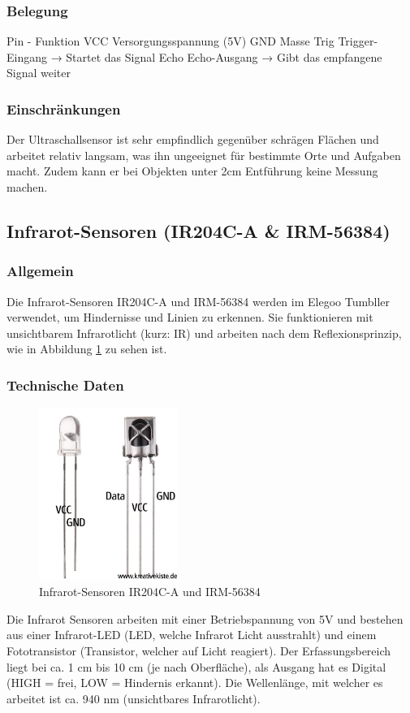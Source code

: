 \subsubsection{Belegung}
Pin  -   	Funktion
VCC	Versorgungsspannung (5V)
GND	Masse
Trig	Trigger-Eingang → Startet das Signal
Echo	Echo-Ausgang → Gibt das empfangene Signal weiter
\subsubsection{Einschränkungen}
Der Ultraschallsensor ist sehr empfindlich
gegenüber schrägen Flächen und arbeitet relativ langsam,
was ihn ungeeignet für bestimmte Orte und Aufgaben macht.
%
Zudem kann er bei Objekten unter 2cm Entführung keine Messung machen.
%
\subsection{Infrarot-Sensoren (IR204C-A \& IRM-56384)}
%
\subsubsection{Allgemein}
Die Infrarot-Sensoren IR204C-A und IRM-56384 werden im Elegoo Tumbller verwendet,
um Hindernisse und Linien zu erkennen.
%
Sie funktionieren mit unsichtbarem Infrarotlicht (kurz: IR)
und arbeiten nach dem Reflexionsprinzip,
wie in Abbildung \ref{fig:infrarot_sensoren} zu sehen ist.
\subsubsection{Technische Daten}
\begin{figure}[H]
    \centering
    \includegraphics[width=0.4\textwidth]{img/Hardware/Infrarot_Sensor.png}
    \caption{Infrarot-Sensoren IR204C-A und IRM-56384}
    \label{fig:infrarot_sensoren}
\end{figure}
Die Infrarot Sensoren arbeiten mit einer Betriebspannung von 5V und bestehen aus einer Infrarot-LED
(LED, welche Infrarot Licht ausstrahlt) und 
einem Fototransistor (Transistor, welcher auf Licht reagiert).
%
Der Erfassungsbereich liegt bei ca. 1 cm bis 10 cm (je nach Oberfläche),
als Ausgang hat es Digital (HIGH = frei, LOW = Hindernis erkannt).
%
Die Wellenlänge, mit welcher es arbeitet ist ca. 940 nm (unsichtbares Infrarotlicht).


